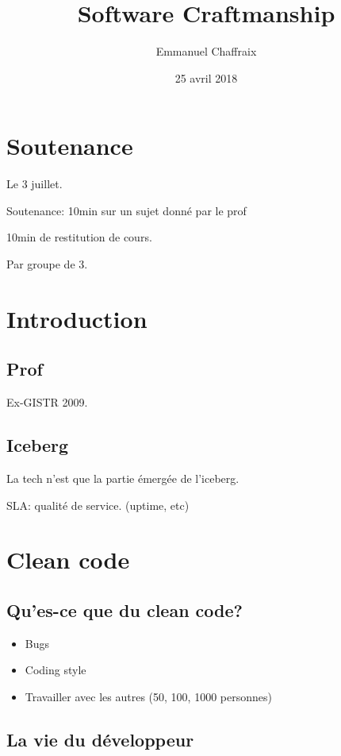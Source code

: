 \documentclass[a4paper,11pt]{article}
\title{Software Craftmanship}
\author{Emmanuel Chaffraix}
\date{25 avril 2018}
\begin{document}
\maketitle
\tableofcontents

\newpage

\section{Soutenance}

Le 3 juillet.

Soutenance: 10min sur un sujet donné par le prof

10min de restitution de cours.

Par groupe de 3.

\section{Introduction}

\subsection{Prof}

Ex-GISTR 2009.

\subsection{Iceberg}

La tech n'est que la partie émergée de l'iceberg.

SLA: qualité de service. (uptime, etc)

\section{Clean code}

\subsection{Qu'es-ce que du clean code?}

\begin{itemize}
\item Bugs
\item Coding style
\item Travailler avec les autres (50, 100, 1000 personnes)
\end{itemize}

\subsection{La vie du développeur}
\end{document}
